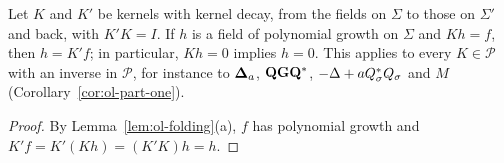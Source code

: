 \begin{lemma}\label{lem:ol-liouville}
Let $K$ and $K'$ be kernels with kernel decay, from the fields on $\Sigma$ to those on $\Sigma'$ and back, with $K'K=I$. If $h$ is a field of polynomial growth on $\Sigma$ and $Kh=f$, then $h=K'f$; in particular, $Kh=0$ implies $h=0$. This applies to every $K\in\mathscr P$ with an inverse in $\mathscr P$, for instance to $\boldsymbol{\Delta}_a$, $\mathbf Q\mathbf G\mathbf Q^*$, $-\Delta+aQ_\sigma^*Q_\sigma$ and $M$ (Corollary~\ref{cor:ol-part-one}).
\end{lemma}

\begin{proof}
By Lemma~\ref{lem:ol-folding}(a), $f$ has polynomial growth and $K'f=K'(Kh)=(K'K)h=h$.
\end{proof}

